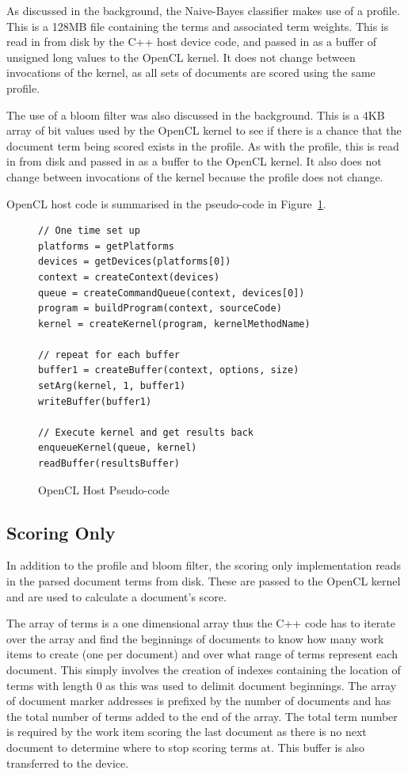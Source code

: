 As discussed in the background, the Naive-Bayes classifier makes use of a
profile. This is a 128MB file containing the terms and associated term weights.
This is read in from disk by the C++ host device code, and passed in as a buffer
of unsigned long values to the OpenCL kernel. It does not change between
invocations of the kernel, as all sets of documents are scored using the same
profile.

The use of a bloom filter was also discussed in the background. This is a 4KB
array of bit values used by the OpenCL kernel to see if there is a chance that
the document term being scored exists in the profile. As with the profile, this
is read in from disk and passed in as a buffer to the OpenCL kernel. It also
does not change between invocations of the kernel because the profile does not
change.

OpenCL host code is summarised in the pseudo-code in
Figure~\ref{fig:openCLPseudocode}.

\begin{figure}
\begin{verbatim}
// One time set up
platforms = getPlatforms
devices = getDevices(platforms[0])
context = createContext(devices)
queue = createCommandQueue(context, devices[0])
program = buildProgram(context, sourceCode)
kernel = createKernel(program, kernelMethodName)

// repeat for each buffer
buffer1 = createBuffer(context, options, size)
setArg(kernel, 1, buffer1)
writeBuffer(buffer1)

// Execute kernel and get results back
enqueueKernel(queue, kernel)
readBuffer(resultsBuffer)
\end{verbatim}
\caption{OpenCL Host Pseudo-code}
\label{fig:openCLPseudocode}
\end{figure}

\subsection{Scoring Only}

In addition to the profile and bloom filter, the scoring only implementation
reads in the parsed document terms from disk. These are passed to the OpenCL
kernel and are used to calculate a document's score.

The array of terms is a one dimensional array thus the C++ code has to iterate
over the array and find the beginnings of documents to know how many work items
to create (one per document) and over what range of terms represent each
document. This simply involves the creation of indexes containing the location
of terms with length 0 as this was used to delimit document beginnings. The
array of document marker addresses is prefixed by the number of documents and
has the total number of terms added to the end of the array. The total term
number is required by the work item scoring the last document as there is no
next document to determine where to stop scoring terms at. This buffer is also
transferred to the device.

